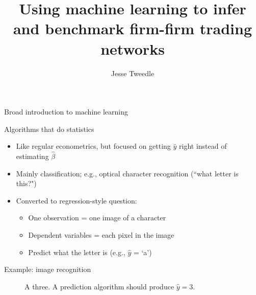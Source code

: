 \documentclass[12pt]{beamer}
\begin{document}
\title{Using machine learning to infer and benchmark firm-firm trading networks}
\author{Jesse Tweedle}

\begin{frame}{}

\maketitle

\end{frame}

\begin{frame}{Broad introduction to machine learning}

\begin{block}{Algorithms that do statistics}
\begin{itemize}
\item Like regular econometrics, but focused on getting $\hat{y}$ right instead of estimating $\hat{\beta}$
\item Mainly classification; e.g., optical character recognition (``what letter is this?")
\item Converted to regression-style question:
\begin{itemize}
\item One observation = one image of a character
\item Dependent variables = each pixel in the image
\item Predict what the letter is (e.g., $\hat{y} $ = `a')
\end{itemize}
\end{itemize}
\end{block}

\end{frame}

\begin{frame}{Example: image recognition}

\begin{figure}[h]
\caption{A three. A prediction algorithm should produce $\hat{y} = 3$.}
\centering
{}
\end{figure}

\end{frame}
\end{document}
